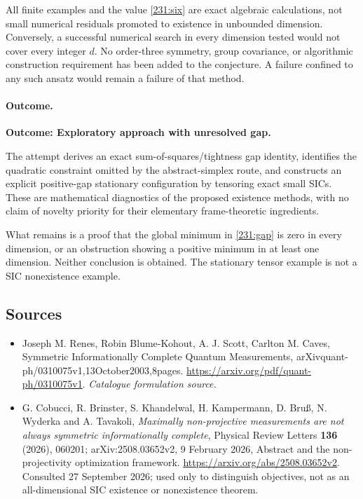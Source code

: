 \documentclass[11pt,a4paper]{article}
\numberwithin{equation}{section}
\begin{document}
All finite examples and the value \eqref{231:six} are exact algebraic
calculations, not small numerical residuals promoted to existence in
unbounded dimension. Conversely, a successful numerical search in every
dimension tested would not cover every integer $d$. No order-three
symmetry, group covariance, or algorithmic construction requirement has
been added to the conjecture. A failure confined to any such ansatz
would remain a failure of that method.

\paragraph{Outcome.}
\textbf{Outcome: Exploratory approach with unresolved gap.}

The attempt derives an exact sum-of-squares/tightness gap identity,
identifies the quadratic constraint omitted by the abstract-simplex
route, and constructs an explicit positive-gap stationary configuration
by tensoring exact small SICs. These are mathematical diagnostics of the
proposed existence methods, with no claim of novelty priority for their
elementary frame-theoretic ingredients.

What remains is a proof that the global minimum in
\eqref{231:gap} is zero in every dimension, or an obstruction showing a
positive minimum in at least one dimension. Neither conclusion is
obtained. The stationary tensor example is not a SIC nonexistence
example.
\subsection{Sources}
\begin{itemize}\raggedright
\item[\textnormal{[S1]}]\hypertarget{source:231:1}{} Joseph M. Renes, Robin Blume-Kohout, A. J. Scott, Carlton M. Caves, Symmetric Informationally Complete Quantum Measurements, arXivquant-ph/0310075v1,13October2003,8pages.
\url{https://arxiv.org/pdf/quant-ph/0310075v1}.
{\small\textit{Catalogue formulation source.}}
\item[\textnormal{[E1]}]\hypertarget{extra:231:1}{}
G. Cobucci, R. Brinster, S. Khandelwal, H. Kampermann, D. Bru\ss,
N. Wyderka and A. Tavakoli, \emph{Maximally non-projective measurements
are not always symmetric informationally complete}, Physical Review
Letters \textbf{136} (2026), 060201; arXiv:2508.03652v2,
9 February 2026, Abstract and the non-projectivity optimization framework.
\url{https://arxiv.org/abs/2508.03652v2}.
Consulted 27 September 2026; used only to distinguish objectives, not as
an all-dimensional SIC existence or nonexistence theorem.
\end{itemize}
\end{document}
